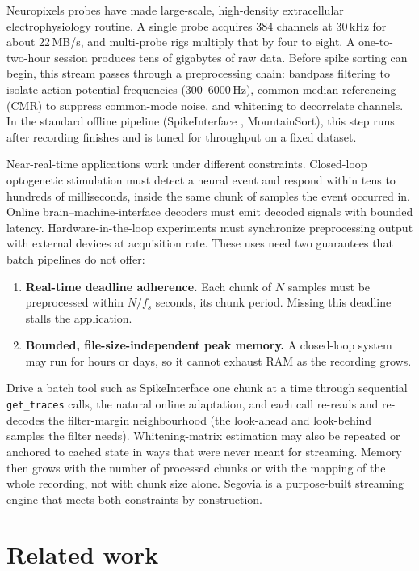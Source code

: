 \documentclass[11pt]{article}
\begin{document}
Neuropixels probes \citep{Jun2017} have made large-scale, high-density extracellular
electrophysiology routine. A single probe acquires 384 channels at 30\,kHz for about 22\,MB/s, and
multi-probe rigs multiply that by four to eight. A one-to-two-hour session produces tens of gigabytes
of raw data. Before spike sorting can begin, this stream passes through a preprocessing chain:
bandpass filtering to isolate action-potential frequencies (300--6000\,Hz), common-median referencing
(CMR) to suppress common-mode noise, and whitening to decorrelate channels. In the standard offline
pipeline (SpikeInterface \citep{Buccino2020}, MountainSort), this step runs after recording finishes
and is tuned for throughput on a fixed dataset.

Near-real-time applications work under different constraints. Closed-loop optogenetic stimulation must
detect a neural event and respond within tens to hundreds of milliseconds, inside the same chunk of
samples the event occurred in. Online brain--machine-interface decoders must emit decoded signals with
bounded latency. Hardware-in-the-loop experiments must synchronize preprocessing output with external
devices at acquisition rate. These uses need two guarantees that batch pipelines do not offer:

\begin{enumerate}
  \item \textbf{Real-time deadline adherence.} Each chunk of $N$ samples must be preprocessed within
  $N / f_s$ seconds, its chunk period. Missing this deadline stalls the application.
  \item \textbf{Bounded, file-size-independent peak memory.} A closed-loop system may run for hours or
  days, so it cannot exhaust RAM as the recording grows.
\end{enumerate}

Drive a batch tool such as SpikeInterface one chunk at a time through sequential \texttt{get\_traces}
calls, the natural online adaptation, and each call re-reads and re-decodes the filter-margin
neighbourhood (the look-ahead and look-behind samples the filter needs). Whitening-matrix estimation
may also be repeated or anchored to cached state in ways that were never meant for streaming. Memory
then grows with the number of processed chunks or with the mapping of the whole recording, not with
chunk size alone. Segovia is a purpose-built streaming engine that meets both constraints by
construction.

\section{Related work}
\end{document}
